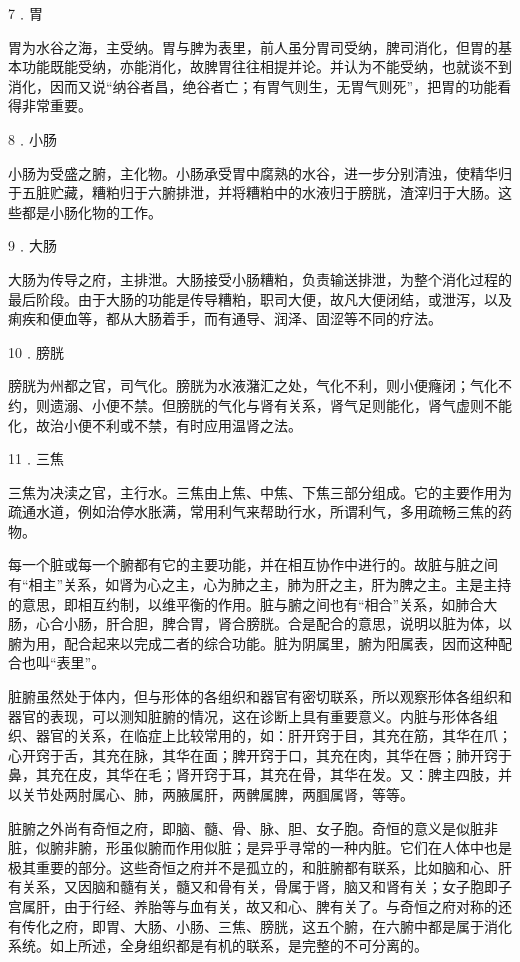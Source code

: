 \documentclass[a4paper,12pt,UTF8,twoside]{ctexbook}
\begin{document}
7﹒胃

胃为水谷之海，主受纳。胃与脾为表里，前人虽分胃司受纳，脾司消化，但胃的基本功能既能受纳，亦能消化，故脾胃往往相提并论。并认为不能受纳，也就谈不到消化，因而又说“纳谷者昌，绝谷者亡；有胃气则生，无胃气则死”，把胃的功能看得非常重要。

8﹒小肠

小肠为受盛之腑，主化物。小肠承受胃中腐熟的水谷，进一步分别清浊，使精华归于五脏贮藏，糟粕归于六腑排泄，并将糟粕中的水液归于膀胱，渣滓归于大肠。这些都是小肠化物的工作。

9﹒大肠

大肠为传导之府，主排泄。大肠接受小肠糟粕，负责输送排泄，为整个消化过程的最后阶段。由于大肠的功能是传导糟粕，职司大便，故凡大便闭结，或泄泻，以及痢疾和便血等，都从大肠着手，而有通导、润泽、固涩等不同的疗法。

10﹒膀胱

膀胱为州都之官，司气化。膀胱为水液潴汇之处，气化不利，则小便癃闭；气化不约，则遗溺、小便不禁。但膀胱的气化与肾有关系，肾气足则能化，肾气虚则不能化，故治小便不利或不禁，有时应用温肾之法。

11﹒三焦

三焦为决渎之官，主行水。三焦由上焦、中焦、下焦三部分组成。它的主要作用为疏通水道，例如治停水胀满，常用利气来帮助行水，所谓利气，多用疏畅三焦的药物。

每一个脏或每一个腑都有它的主要功能，并在相互协作中进行的。故脏与脏之间有“相主”关系，如肾为心之主，心为肺之主，肺为肝之主，肝为脾之主。主是主持的意思，即相互约制，以维平衡的作用。脏与腑之间也有“相合”关系，如肺合大肠，心合小肠，肝合胆，脾合胃，肾合膀胱。合是配合的意思，说明以脏为体，以腑为用，配合起来以完成二者的综合功能。脏为阴属里，腑为阳属表，因而这种配合也叫“表里”。

脏腑虽然处于体内，但与形体的各组织和器官有密切联系，所以观察形体各组织和器官的表现，可以测知脏腑的情况，这在诊断上具有重要意义。内脏与形体各组织、器官的关系，在临症上比较常用的，如：肝开窍于目，其充在筋，其华在爪；心开窍于舌，其充在脉，其华在面；脾开窍于口，其充在肉，其华在唇；肺开窍于鼻，其充在皮，其华在毛；肾开窍于耳，其充在骨，其华在发。又：脾主四肢，并以关节处两肘属心、肺，两腋属肝，两髀属脾，两腘属肾，等等。

脏腑之外尚有奇恒之府，即脑、髓、骨、脉、胆、女子胞。奇恒的意义是似脏非脏，似腑非腑，形虽似腑而作用似脏；是异乎寻常的一种内脏。它们在人体中也是极其重要的部分。这些奇恒之府并不是孤立的，和脏腑都有联系，比如脑和心、肝有关系，又因脑和髓有关，髓又和骨有关，骨属于肾，脑又和肾有关；女子胞即子宫属肝，由于行经、养胎等与血有关，故又和心、脾有关了。与奇恒之府对称的还有传化之府，即胃、大肠、小肠、三焦、膀胱，这五个腑，在六腑中都是属于消化系统。如上所述，全身组织都是有机的联系，是完整的不可分离的。
\end{document}
